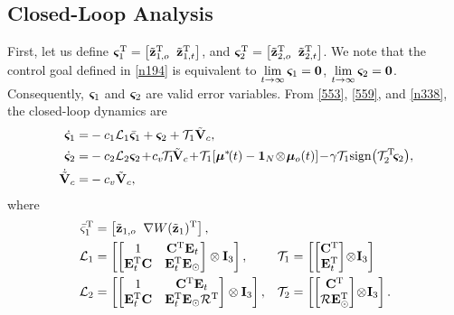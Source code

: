 \subsection{Closed-Loop Analysis}

First, let us define $\bm{\varsigma}_1^{\mathrm{T}} = \left[\tilde{\mathbf{z}}_{1, o}^{\mathrm{T}}\;\;\tilde{\mathbf{z}}_{1, t}^{\mathrm{T}}\right]$, and $\bm{\varsigma}_2^{\mathrm{T}}=\left[\tilde{\mathbf{z}}_{2, o}^{\mathrm{T}}\;\;\tilde{\mathbf{z}}_{2, t}^{\mathrm{T}}\right]$.
We note that the control goal defined in \eqref{n194} is equivalent to $\lim\limits_{t \rightarrow \infty} \bm{\varsigma}_1 = \mathbf{0}$, $\lim\limits_{t \rightarrow \infty} \bm{\varsigma}_2 = \mathbf{0}$.
Consequently, $\bm{\varsigma}_1$ and $\bm{\varsigma}_2$ are valid error variables.
From \eqref{553}, \eqref{559}, and \eqref{n338}, the closed-loop dynamics are
\begin{subequations}\label{n560}\begin{align}
	\dot{\bs{\varsigma}}_1 =& -c_1\mathcal{L}_1\bar{\bs{\varsigma}}_1+\bs{\varsigma}_2+\mathcal{T}_1\tilde{\mat{V}}_c, \label{n560-a}\\
	\dot{\bs{\varsigma}}_2 =& -c_2\mathcal{L}_2\bs{\varsigma}_{2\!}+\!c_{v\!}\mathcal{T}_1\!\tilde{\mat{V}}_c\!+\!\mathcal{T}_1\!\left[\bs{\mu}^*\!(t)-\mathbf{1}_{N}\!\otimes\!\bs{\mu}_o(t)\right]\!-\!\gamma\mathcal{T}_1{\rm sign}\!\left(\mathcal{T}_2\T\!\bs{\varsigma}_2\right)\!\mathrlap{,}\label{n560-b}\\
	\dot{\tilde{\mat{V}}}_c =& -c_v\tilde{\mat{V}}_c, \label{n560-c}
\end{align}\end{subequations}	
where
\begin{subequations} \label{570} \begin{align}
	\bar\varsigma_1^{\mathrm{T}} &= \left[\tilde{\mathbf{z}}_{1, o}\;\;\nabla W(\tilde{\mathbf{z}}_{1})^{\mathrm{T}} \right], & & \label{570-a} \\
	\mathcal{L}_1&=\left[\left[\begin{matrix}
		1&\mathbf{C}^{\mathrm{T}} \mathbf{E}_t\\\mathbf{E}_t^{\mathrm{T}} \mathbf{C}&\mathbf{E}_t^{\mathrm{T}} \mathbf{E}_\odot
		\end{matrix}\right]\otimes \mathbf{I}_3\right],& 
		\mathcal{T}_1 &=\left[\left[\begin{matrix}
		\mathbf{C}^{\mathrm{T}}\\\mathbf{E}_t^{\mathrm{T}}
		\end{matrix}\right]\!\otimes\! \mathbf{I}_3\right] \label{570-b} \\
		\mathcal{L}_2&=\left[\left[\begin{matrix}
		1&\mathbf{C}^{\mathrm{T}} \mathbf{E}_t\\\mathbf{E}_t^{\mathrm{T}} \mathbf{C}&\mathbf{E}_t^{\mathrm{T}} \mathbf{E}_\odot \mathcal{R}^{\mathrm{T}}
		\end{matrix}\right]\otimes \mathbf{I}_3\right],&
		\mathcal{T}_2&=\left[\left[\begin{matrix}
		\mathbf{C}^{\mathrm{T}}\\\mathcal{R} \mathbf{E}_\odot^{\mathrm{T}}
		\end{matrix}\right]\!\otimes\! \mathbf{I}_3\right]. \label{570-c}
\end{align} \end{subequations}

